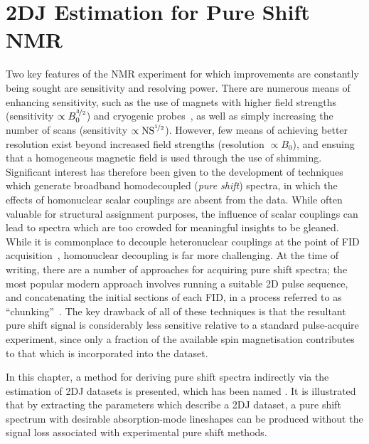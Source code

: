 \chapter{2DJ Estimation for Pure Shift NMR}
\label{chap:cupid}
Two key features of the \ac{NMR} experiment for which improvements are
constantly being sought are sensitivity and resolving power. There are numerous
means of enhancing sensitivity, such as the use of magnets with higher field
strengths~\cite{Maeda2019} (sensitivity $\propto B_0^{\nicefrac{3}{2}}$) and
cryogenic probes~\cite{Kovacs2020}, as well as simply
increasing the number of scans (sensitivity $\propto \operatorname{NS}^{\nicefrac{1}{2}}$)\label{corr:ns}.
However, few means of achieving better resolution exist beyond increased field
strengths (resolution $\propto B_0$), and ensuing that a homogeneous magnetic
field is used through the use of shimming. Significant interest has therefore
been given to the development of techniques which generate broadband homodecoupled
(\emph{pure shift}) spectra, in which the effects of homonuclear scalar
couplings are absent from the data. While often valuable for structural
assignment purposes, the influence of scalar couplings can lead to spectra
which are too crowded for meaningful insights to be gleaned. While it is
commonplace to decouple heteronuclear couplings at the point of \ac{FID}
acquisition~\cite{Shaka1983a, Shaka1983b,Shaka1985}, homonuclear decoupling is
far more challenging. At the time of writing, there are a number of approaches
for acquiring pure shift spectra; the most popular modern approach
involves running a suitable \ac{2D} pulse sequence, and concatenating the initial
sections of each \ac{FID}, in a process referred to as
``chunking''~\cite{Meyer2013,Adams2014,Zangger2015}. The key drawback of all of
these techniques is that the resultant pure shift signal is considerably less
sensitive relative to a standard pulse-acquire experiment, since only a
fraction of the available spin magnetisation contributes to that which is
incorporated into the dataset.

In this chapter, a method for deriving pure shift spectra indirectly via the
estimation of \ac{2DJ} datasets is presented, which has been named
. It is illustrated that by extracting the parameters which
describe a \ac{2DJ} dataset, a pure shift spectrum with desirable
absorption-mode lineshapes can be produced without the signal loss associated
with experimental pure shift methods.





